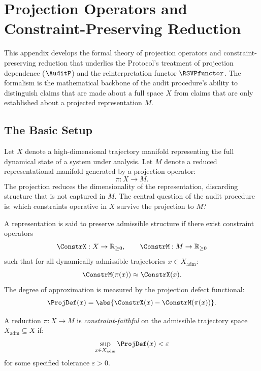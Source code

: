 
\chapter{Projection Operators and Constraint-Preserving Reduction}
\label{app:projection}

\noindent
This appendix develops the formal theory of projection
operators and constraint-preserving reduction that underlies
the \Ortyx{} Protocol's treatment of projection dependence
($\AuditP$) and the reinterpretation functor $\RSVPfunctor$.
The formalism is the mathematical backbone of the audit
procedure's ability to distinguish claims that are made
about a full space $X$ from claims that are only established
about a projected representation $M$.

\section{The Basic Setup}
\label{app-a:setup}

Let $X$ denote a high-dimensional trajectory manifold
representing the full dynamical state of a system under
analysis. Let $M$ denote a reduced representational manifold
generated by a projection operator:
\[
  \pi : X \to M.
\]
The projection reduces the dimensionality of the representation,
discarding structure that is not captured in $M$. The
central question of the audit procedure is: which constraints
operative in $X$ survive the projection to $M$?

A representation is said to preserve admissible structure
if there exist constraint operators
\[
  \ConstrX : X \to \mathbb{R}_{\ge 0}, \qquad
  \ConstrM : M \to \mathbb{R}_{\ge 0}
\]
such that for all dynamically admissible trajectories $x \in X_{\mathrm{adm}}$:
\[
  \ConstrM(\pi(x)) \approx \ConstrX(x).
\]
The degree of approximation is measured by the projection
defect functional:
\[
  \ProjDef(x) = \abs{\ConstrX(x) - \ConstrM(\pi(x))}.
\]

\begin{definition}
A reduction $\pi : X \to M$ is \emph{constraint-faithful}
on the admissible trajectory space $X_{\mathrm{adm}} \subseteq X$
if:
\[
  \sup_{x \in X_{\mathrm{adm}}} \ProjDef(x) < \varepsilon
\]
for some specified tolerance $\varepsilon > 0$.
\end{definition}

